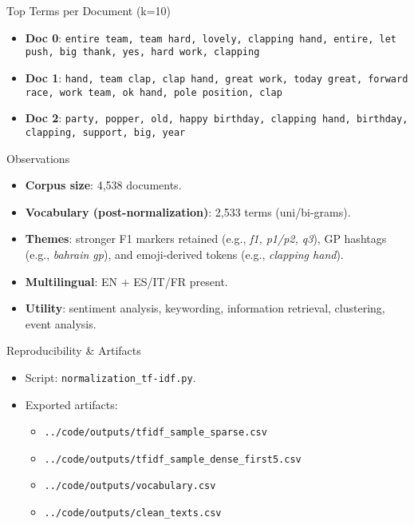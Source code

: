 \documentclass[aspectratio=169]{beamer}
\newcommand{\DATAPATH}{../code/outputs/}
\begin{document}
\begin{frame}{Top Terms per Document (k=10)}
\small

\footnotesize
\begin{itemize}
\item \textbf{Doc 0}: \texttt{entire team, team hard, lovely, clapping hand, entire, let push, big thank, yes, hard work, clapping}
\item \textbf{Doc 1}: \texttt{hand, team clap, clap hand, great work, today great, forward race, work team, ok hand, pole position, clap}
\item \textbf{Doc 2}: \texttt{party, popper, old, happy birthday, clapping hand, birthday, clapping, support, big, year}
\end{itemize}
\end{frame}

\begin{frame}{Observations}
\small
\begin{itemize}
  \item \textbf{Corpus size}: 4{,}538 documents.
  \item \textbf{Vocabulary (post-normalization)}: 2{,}533 terms (uni/bi-grams).
  \item \textbf{Themes}: stronger F1 markers retained (e.g., \textit{f1, p1/p2, q3}), GP hashtags (e.g., \textit{bahrain gp}), and emoji-derived tokens (e.g., \textit{clapping hand}).
  \item \textbf{Multilingual}: EN + ES/IT/FR present.
  \item \textbf{Utility}: sentiment analysis, keywording, information retrieval, clustering, event analysis.
\end{itemize}
\end{frame}

\begin{frame}{Reproducibility \& Artifacts}
\small
\begin{itemize}
  \item Script: \texttt{normalization\_tf-idf.py}.
  \item Exported artifacts:
    \begin{itemize}
      \item \texttt{\DATAPATH tfidf\_sample\_sparse.csv}
      \item \texttt{\DATAPATH tfidf\_sample\_dense\_first5.csv}
      \item \texttt{\DATAPATH vocabulary.csv}
      \item \texttt{\DATAPATH clean\_texts.csv}
    \end{itemize}
\end{itemize}
\end{frame}
\end{document}
